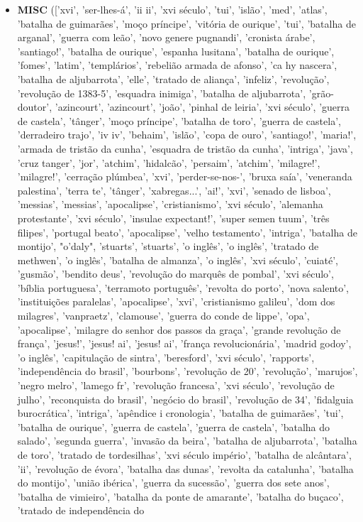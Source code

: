 \documentclass{article}
\begin{document}
\begin{itemize}
'p. 133', 'd. afonso', 'd. joão', 'nuno álvares', 'd. fernando i', 'd. fernando ii', 'd. jaime i', 'd. joão i', 'd. teodósio ii', 'd. joão ii', 'eclipse', 'd. leonor', 'marquesa', 'marquesa', 'algoz', 'leonor de távora', 'sebastião josé', 'marquês de pombal', 'camilo castelo branco', 'camilo castelo branco', 'd. joão i', 'cristo', 'césar', 'v.'])
\item \textbf{MISC} (['xvi', 'ser-lhes-á', 'ii ii', 'xvi século', 'tui', 'islão', 'med', 'atlas', 'batalha de guimarães', 'moço príncipe', 'vitória de ourique', 'tui', 'batalha de arganal', 'guerra com leão', 'novo genere pugnandi', 'cronista árabe', 'santiago!', 'batalha de ourique', 'espanha lusitana', 'batalha de ourique', 'fomes', 'latim', 'templários', 'rebelião armada de afonso', 'ca hy nascera', 'batalha de aljubarrota', 'elle', 'tratado de aliança', 'infeliz', 'revolução', 'revolução de 1383-5', 'esquadra inimiga', 'batalha de aljubarrota', 'grão-doutor', 'azincourt', 'azincourt', 'joão', 'pinhal de leiria', 'xvi século', 'guerra de castela', 'tânger', 'moço príncipe', 'batalha de toro', 'guerra de castela', 'derradeiro trajo', 'iv iv', 'behaim', 'islão', 'copa de ouro', 'santiago!', 'maria!', 'armada de tristão da cunha', 'esquadra de tristão da cunha', 'intriga', 'java', 'cruz tanger', 'jor', 'atchim', 'hidalcão', 'persaim', 'atchim', 'milagre!', 'milagre!', 'cerração plúmbea', 'xvi', 'perder-se-nos-', 'bruxa saía', 'veneranda palestina', 'terra te', 'tânger', 'xabregas...', 'ai!', 'xvi', 'senado de lisboa', 'messias', 'messias', 'apocalipse', 'cristianismo', 'xvi século', 'alemanha protestante', 'xvi século', 'insulae expectant!', 'super semen tuum', 'três filipes', 'portugal beato', 'apocalipse', 'velho testamento', 'intriga', 'batalha de montijo', "o'daly", 'stuarts', 'stuarts', 'o inglês', 'o inglês', 'tratado de methwen', 'o inglês', 'batalha de almanza', 'o inglês', 'xvi século', 'cuiaté', 'gusmão', 'bendito deus', 'revolução do marquês de pombal', 'xvi século', 'bíblia portuguesa', 'terramoto português', 'revolta do porto', 'nova salento', 'instituições paralelas', 'apocalipse', 'xvi', 'cristianismo galileu', 'dom dos milagres', 'vanpraetz', 'clamouse', 'guerra do conde de lippe', 'opa', 'apocalipse', 'milagre do senhor dos passos da graça', 'grande revolução de frança', 'jesus!', 'jesus! ai', 'jesus! ai', 'frança revolucionária', 'madrid godoy', 'o inglês', 'capitulação de sintra', 'beresford', 'xvi século', 'rapports', 'independência do brasil', 'bourbons', 'revolução de 20', 'revolução', 'marujos', 'negro melro', 'lamego fr', 'revolução francesa', 'xvi século', 'revolução de julho', 'reconquista do brasil', 'negócio do brasil', 'revolução de 34', 'fidalguia burocrática', 'intriga', 'apêndice i cronologia', 'batalha de guimarães', 'tui', 'batalha de ourique', 'guerra de castela', 'guerra de castela', 'batalha do salado', 'segunda guerra', 'invasão da beira', 'batalha de aljubarrota', 'batalha de toro', 'tratado de tordesilhas', 'xvi século império', 'batalha de alcântara', 'ii', 'revolução de évora', 'batalha das dunas', 'revolta da catalunha', 'batalha do montijo', 'união ibérica', 'guerra da sucessão', 'guerra dos sete anos', 'batalha de vimieiro', 'batalha da ponte de amarante', 'batalha do buçaco', 'tratado de independência do 
\end{itemize}
\end{document}
